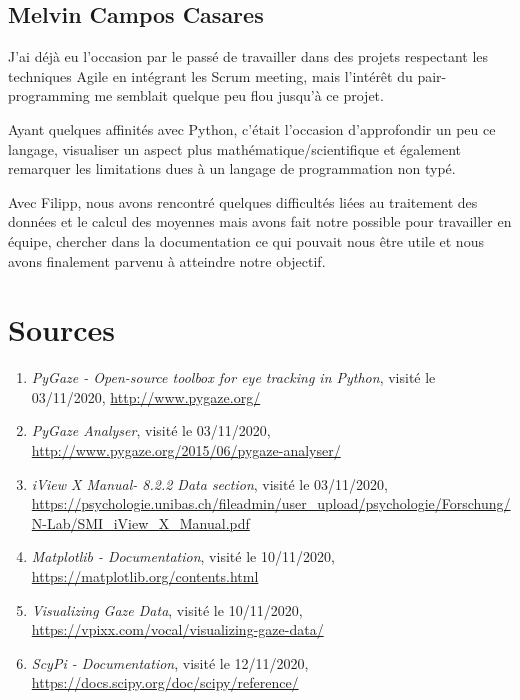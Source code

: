 \documentclass[12pt]{article}
\begin{document}
\subsection{Melvin Campos Casares}

J'ai déjà eu l'occasion par le passé de travailler dans des projets respectant les techniques Agile en intégrant les Scrum meeting, mais l'intérêt du pair-programming me semblait quelque peu flou jusqu'à ce projet.

Ayant quelques affinités avec Python, c'était l'occasion d'approfondir un peu ce langage, visualiser un aspect plus mathématique/scientifique et également remarquer les limitations dues à un langage de programmation non typé.

Avec Filipp, nous avons rencontré quelques difficultés liées au traitement des données et le calcul des moyennes mais avons fait notre possible pour travailler en équipe, chercher dans la documentation ce qui pouvait nous être utile et nous avons finalement parvenu à atteindre notre objectif.

\newpage

\section{Sources}

\begin{enumerate}
    \sloppy
    \item \emph{PyGaze - Open-source toolbox for eye tracking in Python}, visité le 03/11/2020, \url{http://www.pygaze.org/}
    \item \emph{PyGaze Analyser}, visité le 03/11/2020, \url{http://www.pygaze.org/2015/06/pygaze-analyser/}
    \item \emph{iView X Manual- 8.2.2 Data section}, visité le 03/11/2020, \url{https://psychologie.unibas.ch/fileadmin/user_upload/psychologie/Forschung/N-Lab/SMI_iView_X_Manual.pdf}
    \item \emph{Matplotlib - Documentation}, visité le 10/11/2020, \url{https://matplotlib.org/contents.html}
    \item \emph{Visualizing Gaze Data}, visité le 10/11/2020, \url{https://vpixx.com/vocal/visualizing-gaze-data/}
    \item \emph{ScyPi - Documentation}, visité le 12/11/2020, \url{https://docs.scipy.org/doc/scipy/reference/}
\end{enumerate}
\end{document}
